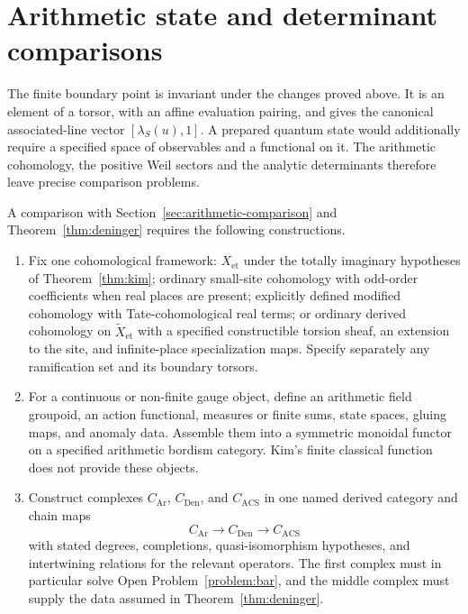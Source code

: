 \section{Arithmetic state and determinant comparisons}
The finite boundary point is invariant under the changes proved above.
It is an element of a torsor, with an affine evaluation pairing, and
gives the canonical associated-line vector $[\lambda_S(u),1]$.
A prepared quantum state would additionally require a specified space of
observables and a functional on it. The arithmetic cohomology, the
positive Weil sectors and the analytic determinants therefore leave
precise comparison problems.

\begin{openproblem}
\label{problem:acs}
A comparison with Section~\ref{sec:arithmetic-comparison} and
Theorem~\ref{thm:deninger} requires the following constructions.

\begin{enumerate}
\item Fix one cohomological framework: \(X_{\mathrm{et}}\) under the totally
imaginary hypotheses of Theorem~\ref{thm:kim}; ordinary small-site
cohomology with odd-order coefficients when real places are present;
explicitly defined modified cohomology with Tate-cohomological real terms;
or ordinary derived cohomology on \(\widetilde X_{\mathrm{et}}\) with a
specified constructible torsion sheaf, an extension to the site, and
infinite-place specialization maps.  Specify separately any ramification
set and its boundary torsors.

\item For a continuous or non-finite gauge object, define an arithmetic
field groupoid, an action functional, measures or finite sums, state spaces,
gluing maps, and anomaly data.  Assemble them into a symmetric monoidal
functor on a specified arithmetic bordism category.  Kim's finite classical
function does not provide these objects.

\item Construct complexes \(C_{\mathrm{Ar}}\), \(C_{\mathrm{Den}}\), and
\(C_{\mathrm{ACS}}\) in one named derived category and chain maps
\[
 C_{\mathrm{Ar}}\longrightarrow C_{\mathrm{Den}}
 \longrightarrow C_{\mathrm{ACS}}
\]
with stated degrees, completions, quasi-isomorphism hypotheses, and
intertwining relations for the relevant operators.  The first complex must
in particular solve Open Problem~\ref{problem:bar}, and the middle complex
must supply the data assumed in Theorem~\ref{thm:deninger}.


\end{enumerate}
\end{openproblem}
